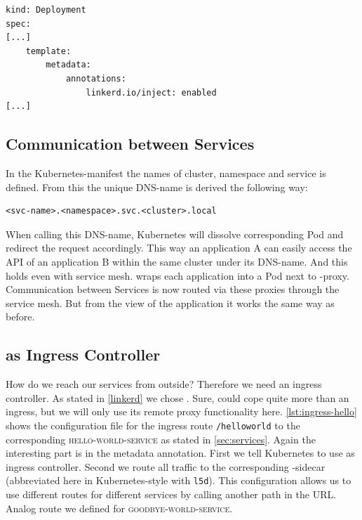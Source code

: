 \begin{lstlisting}[caption={Extract of a Kubernetes manifest annotated by \textsc{Linkerd}.}, label={lst:linkerd-annotation}]
kind: Deployment
spec:
[...]
	template:
		metadata:
			annotations:
				linkerd.io/inject: enabled
[...]				
\end{lstlisting}
 
\subsection{Communication between Services}

In the Kubernetes-manifest the names of cluster, namespace and service is defined.
From this the unique DNS-name is derived the following way:

\begin{lstlisting}[caption={DNS-name of a local service in Kubernetes.}, label={lst:k8s-dns}]
<svc-name>.<namespace>.svc.<cluster>.local
\end{lstlisting}

When calling this DNS-name, Kubernetes will dissolve corresponding Pod and redirect the request accordingly.
This way an application A can easily access the API of an application B within the same cluster under its DNS-name.
And this holds even with service mesh.
\linkerd{} wraps each application into a Pod next to \linkerd{}-proxy.
Communication between Services is now routed via these proxies through the service mesh.
But from the view of the application it works the same way as before.

\subsection{\traefik{} as Ingress Controller}

How do we reach our services from outside?
Therefore we need an ingress controller.
As stated in \autoref{linkerd} we chose \traefik{}.
Sure, \traefik{} could cope quite more than an ingress, but we will only use its remote proxy functionality here.
\autoref{lst:ingress-hello} shows the configuration file for the ingress route \lstinline|/helloworld| to the corresponding \textsc{hello-world-service} as stated in \autoref{sec:services}.
Again the interesting part is in the metadata annotation.
First we tell Kubernetes to use \traefik{} as ingress controller.
Second we route all traffic to the corresponding \linkerd{}-sidecar (abbreviated here in Kubernetes-style with \lstinline|l5d|).
This configuration allows us to use different routes for different services by calling another path in the URL.
Analog route we defined for \textsc{goodbye-world-service}.

